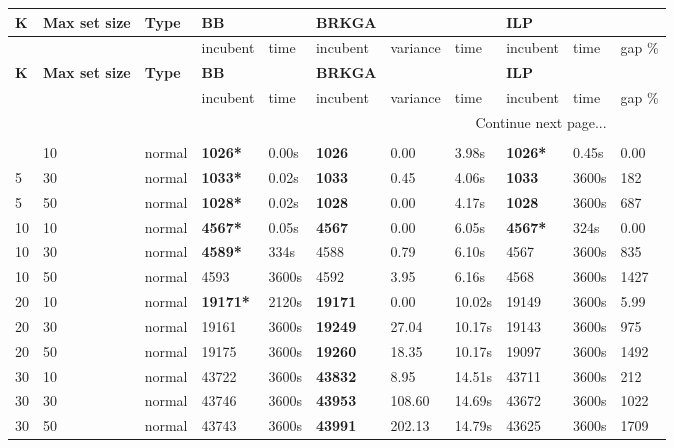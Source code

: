 \begin{scriptsize}
\setlength\LTleft{0pt}            %
\setlength\LTright{0pt}           %
\label{table:tests}
\begin{longtable}{@{\extracolsep{\fill}}l|l|l|ll|lll|lll@{}}
\hline
\textbf{K} & \textbf{Max set size} & \textbf{Type} & \textbf{BB} & & \textbf{BRKGA} & & & \textbf{ILP}\\ 
\hline
& & & incubent & time & incubent & variance & time & incubent & time & gap \%\\ 
\hline
\endfirsthead
\hline
\textbf{K} & \textbf{Max set size} & \textbf{Type} & \textbf{BB} & & \textbf{BRKGA} & & & \textbf{ILP}\\ 
\hline
& & & incubent & time & incubent & variance & time & incubent & time & gap \%\\ 
\hline
\endhead
\hline \multicolumn{10}{r}{{Continue next page...}} \\ 
\endfoot
\multicolumn{10}{r}{{}} \\ 
\endlastfoot
 5 & 10 & normal& \textbf{1026*}& 0.00s& \textbf{1026}& 0.00& 3.98s & \textbf{1026*}& 0.45s & 0.00 \\
 5 & 30 & normal& \textbf{1033*}& 0.02s& \textbf{1033}& 0.45& 4.06s & \textbf{1033}& 3600s& 182 \\
 5 & 50 & normal& \textbf{1028*}& 0.02s& \textbf{1028}& 0.00& 4.17s & \textbf{1028}& 3600s& 687 \\
 10 & 10 & normal& \textbf{4567*}& 0.05s& \textbf{4567}& 0.00& 6.05s & \textbf{4567*}& 324s & 0.00 \\
 10 & 30 & normal& \textbf{4589*}& 334s & 4588& 0.79& 6.10s & 4567& 3600s& 835 \\
 10 & 50 & normal& 4593& 3600s& 4592& 3.95& 6.16s & 4568& 3600s& 1427 \\
 20 & 10 & normal& \textbf{19171*}& 2120s & \textbf{19171}& 0.00& 10.02s & 19149& 3600s& 5.99 \\
 20 & 30 & normal& 19161& 3600s& \textbf{19249}& 27.04& 10.17s & 19143& 3600s& 975 \\
 20 & 50 & normal& 19175& 3600s& \textbf{19260}& 18.35& 10.17s & 19097& 3600s& 1492 \\
 30 & 10 & normal& 43722& 3600s& \textbf{43832}& 8.95& 14.51s & 43711& 3600s& 212 \\
 30 & 30 & normal& 43746& 3600s& \textbf{43953}& 108.60& 14.69s & 43672& 3600s& 1022 \\
 30 & 50 & normal& 43743& 3600s& \textbf{43991}& 202.13& 14.79s & 43625& 3600s& 1709 \\

\end{longtable}
\end{scriptsize}
